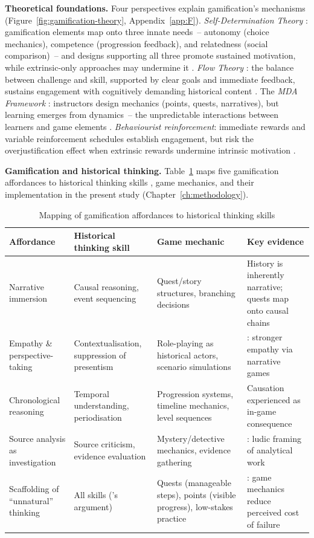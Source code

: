 \textbf{Theoretical foundations.} \label{sec:theory}
Four perspectives explain gamification's mechanisms (Figure~\ref{fig:gamification-theory}, Appendix~\ref{app:F}). \textit{Self-Determination Theory} \cite{RyanDeci2000}: gamification elements map onto three innate needs~-- autonomy (choice mechanics), competence (progression feedback), and relatedness (social comparison)~-- and designs supporting all three promote sustained motivation, while extrinsic-only approaches may undermine it \cite{Sailer2017, Gupta2022341}. \textit{Flow Theory} \cite{Csikszentmihalyi1990}: the balance between challenge and skill, supported by clear goals and immediate feedback, sustains engagement with cognitively demanding historical content \cite{Ho2024139}. The \textit{MDA Framework} \cite{Hunicke2004}: instructors design mechanics (points, quests, narratives), but learning emerges from dynamics~-- the unpredictable interactions between learners and game elements \cite{Bozic2024538}. \textit{Behaviourist reinforcement}: immediate rewards and variable reinforcement schedules establish engagement, but risk the overjustification effect when extrinsic rewards undermine intrinsic motivation \cite{Nunez-Naranjo2024106, Prieto-Andreu2024244}.

\textbf{Gamification and historical thinking.}
Table~\ref{tab:gamification-ht} maps five gamification affordances to historical thinking skills \cite{Wineburg2001}, game mechanics, and their implementation in the present study (Chapter~\ref{ch:methodology}).

\begin{table}[!h]
\centering
\caption{Mapping of gamification affordances to historical thinking skills}
\label{tab:gamification-ht}
\small
\begin{tabular}{@{}p{2.5cm}p{3cm}p{3.5cm}p{3.5cm}@{}}
\toprule
\textbf{Affordance} & \textbf{Historical thinking skill} & \textbf{Game mechanic} & \textbf{Key evidence} \\
\midrule
Narrative immersion & Causal reasoning, event sequencing & Quest/story structures, branching decisions & History is inherently narrative; quests map onto causal chains \\
\midrule
Empathy \& perspective-taking & Contextualisation, suppression of presentism & Role-playing as historical actors, scenario simulations & \citet{12Gilbert2019108}: stronger empathy via narrative games \\
\midrule
Chronological reasoning & Temporal understanding, periodisation & Progression systems, timeline mechanics, level sequences & Causation experienced as in-game consequence \\
\midrule
Source analysis as investigation & Source criticism, evidence evaluation & Mystery/detective mechanics, evidence gathering & \citet{55Squire2004}: ludic framing of analytical work \\
\midrule
Scaffolding of ``unnatural'' thinking & All skills (\citeauthor{Wineburg2001}'s argument) & Quests (manageable steps), points (visible progress), low-stakes practice & \citet{Qian2016}: game mechanics reduce perceived cost of failure \\
\bottomrule
\end{tabular}
\end{table}

